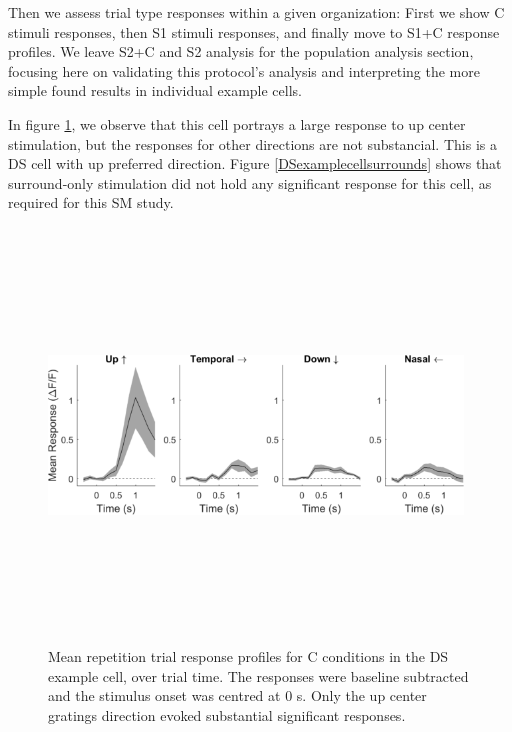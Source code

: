 Then we assess trial type responses within a given organization: First we show C stimuli responses, then S1 stimuli responses, and finally move to S1+C response profiles. We leave S2+C and S2 analysis for the population analysis section, focusing here on validating this protocol's analysis and interpreting the more simple found results in individual example cells.

In figure \ref{DSexamplecellcenter}, we observe that this cell portrays a large response to up center stimulation, but the responses for other directions are not substancial. This is a DS cell with up preferred direction. Figure \ref{DSexamplecellsurrounds} shows that surround-only stimulation did not hold any significant response for this cell, as required for this SM study.

\begin{figure}[H] \centering \includegraphics[width=11cm,height=11cm,keepaspectratio]{Figures/7.Results/individualSM/roi_29_mf379_pos5/1.png} 
\caption{Mean repetition trial response profiles for C conditions in the DS example cell, over trial time. The responses were baseline subtracted and the stimulus onset was centred at 0 s. Only the up center gratings direction evoked substantial significant responses.}
\label{DSexamplecellcenter}
\end{figure}


